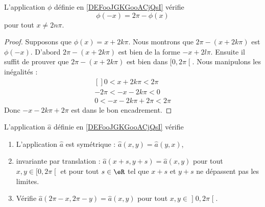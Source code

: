 \begin{proposition}	\label{PROPooUUNDooDnpkQo}
	L'application \( \phi\) définie en \ref{DEFooJGKGooACjQsI} vérifie
	\begin{equation}
		\phi(-x)=2\pi-\phi(x)
	\end{equation}
	pour tout \( x\neq 2n\pi\).
\end{proposition}

\begin{proof}
	Supposons que \( \phi(x)=x+2k\pi\). Nous montrons que \( 2\pi-(x+2k\pi)\) est \( \phi(-x)\). D'abord \( 2\pi-(x+2k\pi)\) est bien de la forme \( -x+2l\pi\). Ensuite il suffit de prouver que \( 2\pi-(x+2k\pi)\) est bien dans \( \mathopen[ 0,2\pi\mathclose[\). Nous manipulons les inégalités :
	\begin{equation}
		\begin{aligned}[]
			0<x+2k\pi<2\pi   \\
			-2\pi<-x-2k\pi<0 \\
			0<-x-2k\pi+2\pi<2\pi
		\end{aligned}
	\end{equation}
	Donc \( -x-2k\pi+2\pi\) est dans le bon encadrement.
\end{proof}


\begin{proposition}	\label{PROPooOJSIooBCRZxou}
	L'application \( \hat a\) définie en \ref{DEFooJGKGooACjQsI} vérifie
	\begin{enumerate}
		\item		\label{ITEMooXFTDooVTCCpp}
		      L'application \( \hat a\) est symétrique : \( \hat a(x,y)=\hat a(y,x)\),
		\item		\label{ITEMooWVELooTTZKao}
		      invariante par translation : \( \hat a(x+s,y+s)=\hat a(x,y)\) pour tout \( x,y\in \mathopen[ 0,2\pi\mathclose[\) et pour tout \( s\in \eR\) tel que \( x+s\) et \( y+s\) ne dépassent pas les limites.
		\item		\label{ITEMooVDUCooPtjlPA}
		      Vérifie \( \hat a(2\pi -x,2\pi-y)=\hat a(x,y)\) pour tout \( x,y\in \mathopen] 0,2\pi\mathclose[\).
	\end{enumerate}
\end{proposition}

